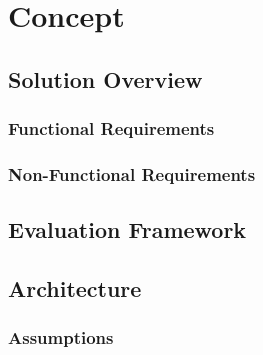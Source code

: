 
\chapter{Concept}
\label{chp:concept}

\section{Solution Overview}
	
	\subsection{Functional Requirements}
	
	\subsection{Non-Functional Requirements}

\section{Evaluation Framework}

\section{Architecture}

	\subsection{Assumptions}

